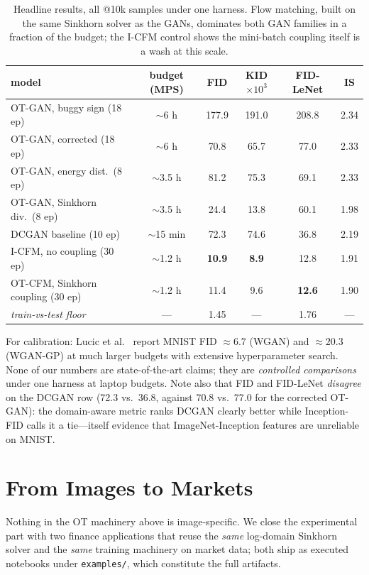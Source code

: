 \documentclass[10pt,twocolumn]{article}
\begin{document}
\begin{table}[t]
\centering
\small
\begin{tabular}{lccccc}
\toprule
model & budget (MPS) & FID & KID$\times 10^3$ & FID-LeNet & IS \\
\midrule
OT-GAN, buggy sign (18 ep) & $\sim$6 h & 177.9 & 191.0 & 208.8 & 2.34 \\
OT-GAN, corrected (18 ep)  & $\sim$6 h & 70.8 & 65.7 & 77.0 & 2.33 \\
OT-GAN, energy dist.\ (8 ep) & $\sim$3.5 h & 81.2 & 75.3 & 69.1 & 2.33 \\
OT-GAN, Sinkhorn div.\ (8 ep) & $\sim$3.5 h & 24.4 & 13.8 & 60.1 & 1.98 \\
DCGAN baseline (10 ep) & $\sim$15 min & 72.3 & 74.6 & 36.8 & 2.19 \\
I-CFM, no coupling (30 ep) & $\sim$1.2 h & \textbf{10.9} & \textbf{8.9} & 12.8 & 1.91 \\
OT-CFM, Sinkhorn coupling (30 ep) & $\sim$1.2 h & 11.4 & 9.6 & \textbf{12.6} & 1.90 \\
\midrule
\emph{train-vs-test floor} & --- & 1.45 & --- & 1.76 & --- \\
\bottomrule
\end{tabular}
\caption{Headline results, all @10k samples under one harness. Flow matching, built on
the same Sinkhorn solver as the GANs, dominates both GAN families in a fraction of the
budget; the I-CFM control shows the mini-batch coupling itself is a wash at this scale.}
\label{tab:headline}
\end{table}

For calibration: Lucic et al.~\cite{lucic2018} report MNIST FID $\approx 6.7$ (WGAN) and
$\approx 20.3$ (WGAN-GP) at much larger budgets with extensive hyperparameter search.
None of our numbers are state-of-the-art claims; they are \emph{controlled comparisons}
under one harness at laptop budgets. Note also that FID and FID-LeNet \emph{disagree} on
the DCGAN row (72.3 vs.\ 36.8, against 70.8 vs.\ 77.0 for the corrected OT-GAN): the
domain-aware metric ranks DCGAN clearly better while Inception-FID calls it a tie---itself
evidence that ImageNet-Inception features are unreliable on MNIST.

\section{From Images to Markets}
\label{sec:finance}
Nothing in the OT machinery above is image-specific. We close the experimental part
with two finance applications that reuse the \emph{same} log-domain Sinkhorn solver
and the \emph{same} training machinery on market data; both ship as executed
notebooks under \texttt{examples/}, which constitute the full artifacts.
\end{document}

